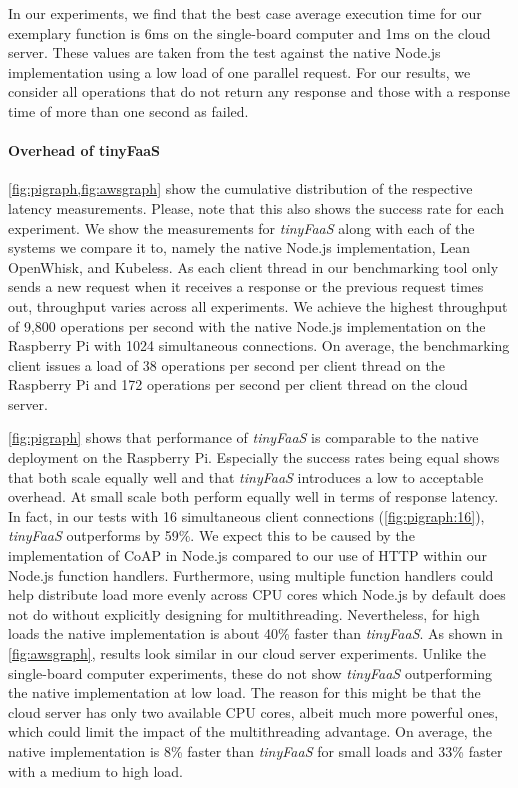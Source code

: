 In our experiments, we find that the best case average execution time for our exemplary function is 6ms on the single-board computer and 1ms on the cloud server.
These values are taken from the test against the native Node.js implementation using a low load of one parallel request.
For our results, we consider all operations that do not return any response and those with a response time of more than one second as failed.

\paragraph{Overhead of tinyFaaS}
\cref{fig:pigraph,fig:awsgraph} show the cumulative distribution of the respective latency measurements.
Please, note that this also shows the success rate for each experiment.
We show the measurements for \textit{tinyFaaS} along with each of the systems we compare it to, namely the native Node.js implementation, Lean OpenWhisk, and Kubeless.
As each client thread in our benchmarking tool only sends a new request when it receives a response or the previous request times out, throughput varies across all experiments.
We achieve the highest throughput of 9,800 operations per second with the native Node.js implementation on the Raspberry Pi with 1024 simultaneous connections.
On average, the benchmarking client issues a load of 38 operations per second per client thread on the Raspberry Pi and 172 operations per second per client thread on the cloud server.

\cref{fig:pigraph} shows that performance of \textit{tinyFaaS} is comparable to the native deployment on the Raspberry Pi.
Especially the success rates being equal shows that both scale equally well and that \textit{tinyFaaS} introduces a low to acceptable overhead.
At small scale both perform equally well in terms of response latency.
In fact, in our tests with 16 simultaneous client connections (\cref{fig:pigraph:16}), \textit{tinyFaaS} outperforms by 59\%.
We expect this to be caused by the implementation of CoAP in Node.js compared to our use of HTTP within our Node.js function handlers.
Furthermore, using multiple function handlers could help distribute load more evenly across CPU cores which Node.js by default does not do without explicitly designing for multithreading.
Nevertheless, for high loads the native implementation is about 40\% faster than \textit{tinyFaaS}.
As shown in \cref{fig:awsgraph}, results look similar in our cloud server experiments.
Unlike the single-board computer experiments, these do not show \textit{tinyFaaS} outperforming the native implementation at low load.
The reason for this might be that the cloud server has only two available CPU cores, albeit much more powerful ones, which could limit the impact of the multithreading advantage.
On average, the native implementation is 8\% faster than \textit{tinyFaaS} for small loads and 33\% faster with a medium to high load.

